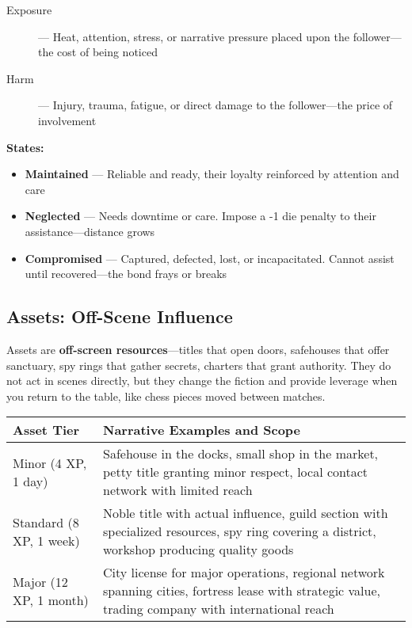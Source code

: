 \begin{description}
    \item[Exposure] --- Heat, attention, stress, or narrative pressure placed upon the follower—the cost of being noticed
    \item[Harm] --- Injury, trauma, fatigue, or direct damage to the follower—the price of involvement
\end{description}

\textbf{States:}
\begin{itemize}
    \item \textbf{Maintained} --- Reliable and ready, their loyalty reinforced by attention and care
    \item \textbf{Neglected} --- Needs downtime or care. Impose a -1 die penalty to their assistance—distance grows
    \item \textbf{Compromised} --- Captured, defected, lost, or incapacitated. Cannot assist until recovered—the bond frays or breaks
\end{itemize}

\subsection*{Assets: Off-Scene Influence}

Assets are \textbf{off-screen resources}---titles that open doors, safehouses that offer sanctuary, spy rings that gather secrets, charters that grant authority. They do not act in scenes directly, but they change the fiction and provide leverage when you return to the table, like chess pieces moved between matches.

\begin{fatebox}
\begin{tabularx}{\textwidth}{lX}
\toprule
\textbf{Asset Tier} & \textbf{Narrative Examples and Scope} \\
\midrule
Minor (4 XP, 1 day) & Safehouse in the docks, small shop in the market, petty title granting minor respect, local contact network with limited reach \\
Standard (8 XP, 1 week) & Noble title with actual influence, guild section with specialized resources, spy ring covering a district, workshop producing quality goods \\
Major (12 XP, 1 month) & City license for major operations, regional network spanning cities, fortress lease with strategic value, trading company with international reach \\
\bottomrule
\end{tabularx}
\end{fatebox}

